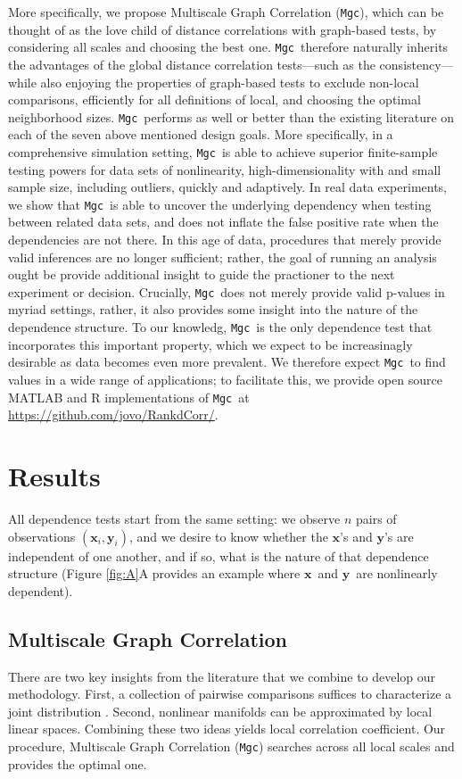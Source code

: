 \documentclass[11pt]{article}
\providecommand{\sct}[1]{{\sc \texttt{#1}}}
\providecommand{\mb}[1]{\boldsymbol{#1}}
\newcommand{\Mgc}{\sct{Mgc}}
\newcommand{\website}{\url{https://github.com/jovo/RankdCorr/}}
\newcommand{\mbx}{\ensuremath{\mb{x}}}
\newcommand{\mby}{\ensuremath{\mb{y}}}
\begin{document}
More specifically,  we propose Multiscale Graph Correlation (\Mgc), which can be thought of as the love child of distance correlations with graph-based tests, by considering all scales and choosing the best one.  \Mgc~therefore  naturally inherits the advantages of the global distance correlation tests---such as the consistency---while also enjoying the properties of graph-based tests to exclude non-local comparisons, efficiently for all definitions of local, and choosing the optimal neighborhood sizes. \Mgc~performs as well or better than the existing literature on each of the seven above mentioned design goals. More specifically, in a comprehensive simulation setting, \Mgc~is able to achieve superior finite-sample testing powers for data sets of nonlinearity, high-dimensionality with and small sample size, including outliers, quickly and adaptively.  In real data experiments, we show that \Mgc~is able to uncover the underlying dependency when testing between related data sets,  and does not inflate the false positive rate when the dependencies are not there. 
In this age of data, procedures that merely provide valid inferences are no longer sufficient; rather, the goal of running an analysis ought be provide additional insight to guide the practioner to the next experiment or decision.  Crucially, \Mgc~does not merely provide valid p-values in myriad settings, rather, it also provides some insight into the nature of the dependence structure. To our knowledg, \Mgc~is the only dependence test that incorporates this important property, which we expect to be increasinagly desirable as data becomes even more prevalent. We therefore expect \Mgc~to find values in a wide range of applications; to facilitate this, we provide open source MATLAB and R implementations of \Mgc~at \website.

\section{Results}
\label{main}

All dependence tests start from the same setting: we observe $n$ pairs of observations $(\mbx_i,\mby_i)$, and we desire to know whether the \mbx's and \mby's are independent of one another, and if so, what is the nature of that dependence structure (Figure \ref{fig:A}A provides an example where \mbx~and \mby~are nonlinearly dependent).  

\subsection{Multiscale Graph Correlation} 
\label{main1}
There are two key insights from the literature that we combine to develop our methodology.  First, a collection of pairwise comparisons  suffices to characterize a joint distribution \cite{Maa1996}.  Second, nonlinear manifolds can be approximated by local linear spaces.  Combining these two ideas yields local correlation coefficient. Our procedure, Multiscale Graph Correlation (\Mgc) searches across all local scales and provides the optimal one.   
\end{document}
